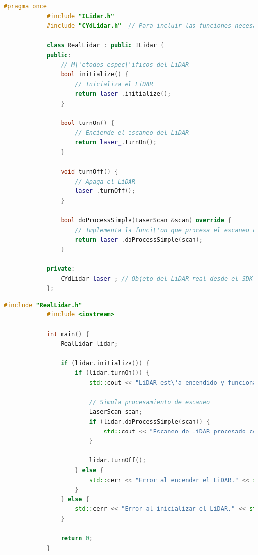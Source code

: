         \begin{lstlisting}[language={C++}, caption={RealLidar.h}, label={Script}]
            #pragma once
            #include "ILidar.h"
            #include "CYdLidar.h"  // Para incluir las funciones necesarias como initialize, turnOn, turnOff

            class RealLidar : public ILidar {
            public:
                // M\'etodos espec\'ificos del LiDAR
                bool initialize() {
                    // Inicializa el LiDAR
                    return laser_.initialize();
                }

                bool turnOn() {
                    // Enciende el escaneo del LiDAR
                    return laser_.turnOn();
                }

                void turnOff() {
                    // Apaga el LiDAR
                    laser_.turnOff();
                }

                bool doProcessSimple(LaserScan &scan) override {
                    // Implementa la funci\'on que procesa el escaneo de LiDAR
                    return laser_.doProcessSimple(scan);
                }

            private:
                CYdLidar laser_; // Objeto del LiDAR real desde el SDK
            };
        \end{lstlisting}
        \begin{lstlisting}[language={C++}, caption={main.cpp}, label={Script}]
            #include "RealLidar.h"
            #include <iostream>

            int main() {
                RealLidar lidar;

                if (lidar.initialize()) {
                    if (lidar.turnOn()) {
                        std::cout << "LiDAR est\'a encendido y funcionando." << std::endl;

                        // Simula procesamiento de escaneo
                        LaserScan scan;
                        if (lidar.doProcessSimple(scan)) {
                            std::cout << "Escaneo de LiDAR procesado correctamente." << std::endl;
                        }

                        lidar.turnOff();
                    } else {
                        std::cerr << "Error al encender el LiDAR." << std::endl;
                    }
                } else {
                    std::cerr << "Error al inicializar el LiDAR." << std::endl;
                }

                return 0;
            }
        \end{lstlisting}
